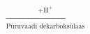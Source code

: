 \documentclass[preview]{standalone}
\begin{document}
\begin{align*}
\xrightarrow[\text{Püruvaadi dekarboksülaas}]{+\text{H}^+}
\end{align*}
\end{document}
